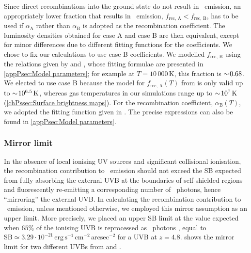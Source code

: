 Since direct recombinations into the ground state do not result in \lya\ emission, an appropriately lower fraction that results in \lya\ emission, $f_\text{rec, A} < f_\text{rec, B}$, has to be used if $\alpha_\text{A}$ rather than $\alpha_\text{B}$ is adopted as the recombination coefficient. The luminosity densities obtained for case A and case B are then equivalent, except for minor differences due to different fitting functions for the coefficients. We chose to fix our calculations to use case-B coefficients. We modelled $f_\text{rec, B}$ using the relations given by \citet{2008ApJ...672...48C} and \citet{2014PASA...31...40D}, whose fitting formulae are presented in \cref{appPsec:Model parameters}; for example at $T = 10\,000 \, \mathrm{K}$, this fraction is $\sim \! 0.68$. We elected to use case B because the model for $f_\text{rec, A} (T)$ from \citet{2014PASA...31...40D} is only valid up to $\sim \! 10^{6.5} \, \mathrm{K}$, whereas gas temperatures in our simulations range up to $\sim \! 10^{7} \, \mathrm{K}$ (\cref{chPssec:Surface brightness maps}). For the recombination coefficient, $\alpha_\text{B}(T)$, we adopted the fitting function given in \citet{2011piim.book.....D}. The precise expressions can also be found in \cref{appPsec:Model parameters}.

\subsubsection{Mirror limit}
\label{chPsssec:Mirror limit}

In the absence of local ionising UV sources and significant collisional ionisation, the recombination contribution to \lya\ emission should not exceed the SB expected from fully absorbing the external UVB at the boundaries of self-shielded regions and fluorescently re-emitting a corresponding number of \lya\ photons, hence ``mirroring'' the external UVB. In calculating the recombination contribution to \lya\ emission, unless mentioned otherwise, we employed this mirror assumption as an upper limit. More precisely, we placed an upper $\text{SB}$ limit at the value expected when $65\%$ of the ionising UVB is reprocessed as \lya\ photons \citep[e.g.][]{1996ApJ...468..462G, 2005ApJ...628...61C}, equal to $\text{SB} \simeq 3.29 \cdot 10^{-21} \, \mathrm{erg \, s^{-1} \, cm^{-2} \, arcsec^{-2}}$ for a  UVB at $z=4.8$.  shows the mirror limit for two different UVBs from  and \citet[;  hereafter]{2019MNRAS.485...47P}.

